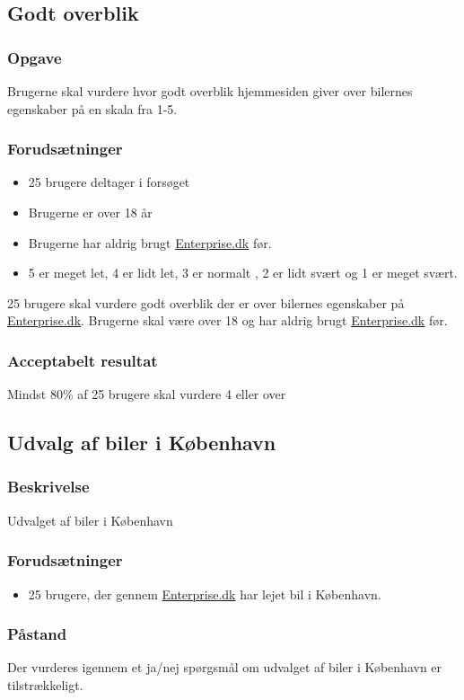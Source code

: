 \documentclass[a4paper,10pt]{article}
\begin{document}
\subsection{Godt overblik}
\subsubsection{Opgave}
Brugerne skal vurdere hvor godt overblik hjemmesiden giver over bilernes egenskaber på en skala fra 1-5. 
\subsubsection{Forudsætninger}
\begin{itemize}
	\item 25 brugere deltager i forsøget
	\item Brugerne er over 18 år
	\item Brugerne har aldrig brugt \href{http://Enterprise.dk}{Enterprise.dk} før.
	\item 5 er meget let, 4 er lidt let, 3 er normalt , 2 er lidt svært og 1 er meget svært.
\end{itemize}
25 brugere skal vurdere godt overblik der er over bilernes egenskaber på \href{http://Enterprise.dk}{Enterprise.dk}. Brugerne skal være over 18 og har aldrig brugt \href{http://Enterprise.dk}{Enterprise.dk} før.
\subsubsection{Acceptabelt resultat}
Mindst 80\% af 25 brugere skal vurdere 4 eller over

\subsection{Udvalg af biler i København}
\subsubsection{Beskrivelse}
Udvalget af biler i København
\subsubsection{Forudsætninger}
\begin{itemize}
    \item{25 brugere, der gennem  \href{http://Enterprise.dk}{Enterprise.dk} har lejet bil i København.}
\end{itemize}

\subsubsection{Påstand}
Der vurderes igennem et ja/nej spørgsmål om udvalget af biler i København er tilstrækkeligt.
\end{document}
